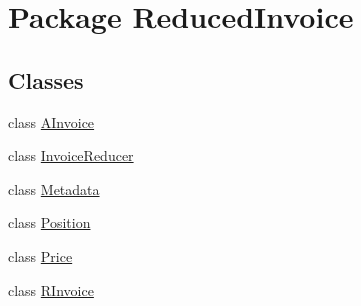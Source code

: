 \hypertarget{namespace_reduced_invoice}{\section{Package Reduced\-Invoice}
\label{namespace_reduced_invoice}
}
\subsection*{Classes}
\begin{DoxyCompactItemize}
\item 
class \hyperlink{class_reduced_invoice_1_1_a_invoice}{A\-Invoice}
\item 
class \hyperlink{class_reduced_invoice_1_1_invoice_reducer}{Invoice\-Reducer}
\item 
class \hyperlink{class_reduced_invoice_1_1_metadata}{Metadata}
\item 
class \hyperlink{class_reduced_invoice_1_1_position}{Position}
\item 
class \hyperlink{class_reduced_invoice_1_1_price}{Price}
\item 
class \hyperlink{class_reduced_invoice_1_1_r_invoice}{R\-Invoice}
\end{DoxyCompactItemize}
